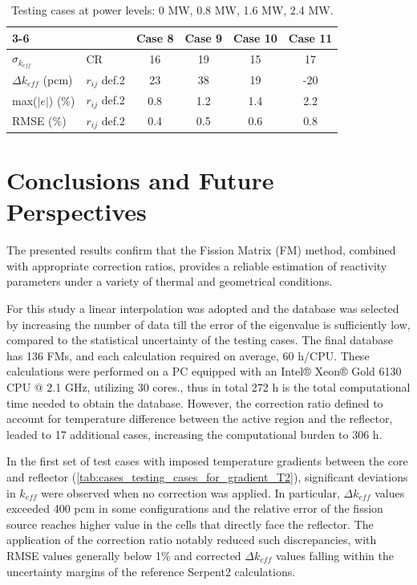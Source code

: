 \documentclass[preprint,review,12pt]{elsarticle}
\begin{document}
\begin{table}[h!]
\FloatBarrier
\caption{Testing cases at power levels: 0 MW, 0.8 MW, 1.6 MW, 2.4 MW.}
\centering
\begin{tabular}{llcccc}
\cline{3-6}
&                                                  & Case 8 & Case 9 & Case 10 & Case 11 \\ \hline
$\sigma_{k_{eff}}$ & \multicolumn{1}{l|}{CR}         &    16    &    19    & 15  & 17    \\ \hline
$\Delta k_{eff}$ (pcm)   
& \multicolumn{1}{l|}{$r_{ij}$ def.2}      &    23    &    38    & 19  & -20  \\ \hline
max($|e|$) (\%)     
& \multicolumn{1}{l|}{$r_{ij}$ def.2}    &    0.8   &   1.2     &     1.4   & 2.2 \\ \hline
RMSE (\%)         
& \multicolumn{1}{l|}{$r_{ij}$ def.2}    &      0.4  &   0.5   &   0.6     & 0.8 \\ \hline
\end{tabular}
\label{tab:testing_cases_8_9_10_11}
\end{table}


\section{Conclusions and Future Perspectives}

The presented results confirm that the Fission Matrix (FM) method, combined with appropriate correction ratios, provides a reliable estimation of reactivity parameters under a variety of thermal and geometrical conditions.

For this study a linear interpolation was adopted and  the database was selected by increasing the number of data till the error of the eigenvalue is sufficiently low, compared to the statistical uncertainty of the testing cases. The final database has 136 FMs, and each calculation required on average, 60 h/CPU. These calculations were performed on a PC equipped with an Intel® Xeon® Gold 6130 CPU @ 2.1 GHz, utilizing 30 cores., thus in total 272 h is the total computational time needed to obtain the database. However, the correction ratio defined to account for temperature difference between the active region and the reflector, leaded to 17 additional cases, increasing the computational burden to 306 h. 

In the first set of test cases with imposed temperature gradients between the core and reflector (\cref{tab:cases_testing_cases_for_gradient_T2}), significant deviations in $k_{eff}$ were observed when no correction was applied. In particular, $\Delta k_{eff}$ values exceeded 400 pcm in some configurations and the relative error of the fission source reaches higher value in the cells that directly face the reflector. The application of the correction ratio notably reduced such discrepancies, with RMSE values generally below 1\% and corrected $\Delta k_{eff}$ values falling within the uncertainty margins of the reference Serpent2 calculations.
\end{document}
